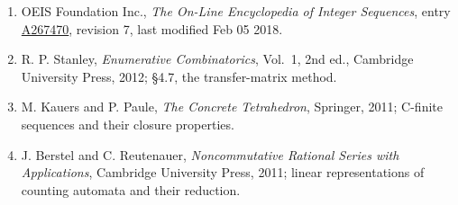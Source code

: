 \documentclass[11pt]{article}
\theoremstyle{definition}
\begin{document}
\begin{enumerate}

\item OEIS Foundation Inc., \emph{The On-Line Encyclopedia of Integer Sequences}, entry \href{https://oeis.org/A267470}{A267470}, revision 7, last modified Feb 05 2018.

\item R. P. Stanley, \emph{Enumerative Combinatorics}, Vol.~1, 2nd ed., Cambridge University Press, 2012; \S4.7, the transfer-matrix method.

\item M. Kauers and P. Paule, \emph{The Concrete Tetrahedron}, Springer, 2011; C-finite sequences and their closure properties.

\item J. Berstel and C. Reutenauer, \emph{Noncommutative Rational Series with Applications}, Cambridge University Press, 2011; linear representations of counting automata and their reduction.

\end{enumerate}
\end{document}
